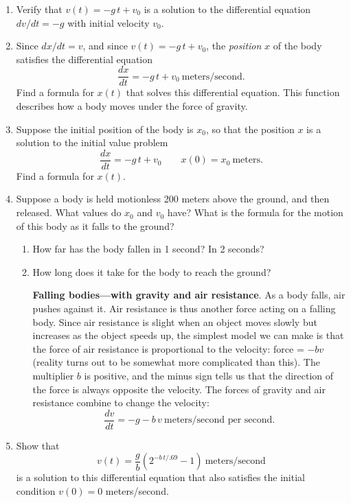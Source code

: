 \begin{enumerate}
\item Verify that $v(t) = -g\,t + v_0$\label{falling body0} is a
solution to the differential equation $dv/dt = -g$ with initial
velocity $v_0$.


\item Since $dx/dt = v$, and since $v(t) = -g\,t + v_0$, the {\em position\/} $x$ of the body satisfies the differential equation
	\[
\dfrac{dx}{dt} = -g\,t + v_0 \ \mbox{meters/second}.
\]
Find a formula for $x(t)$ that solves this differential equation.  This function describes how a body moves under the force of gravity.


\item Suppose the initial position of the body is $x_0$, so that the position $x$ is a solution to the initial value problem
	\[
\dfrac{dx}{dt} = -g\,t + v_0 \qquad x(0) = x_0 \ 
		\mbox{meters}.
\]
Find a formula for $x(t)$.


\item Suppose a body is held motionless 200 meters above the ground, and then released.  What values do $x_0$ and $v_0$ have?  What is the formula for the motion of this body as it falls to the ground?

  \begin{enumerate}
  \item How far has the body fallen in 1 second?  In 2 seconds?

  \item How long does it take for the body to reach the ground?



\label{fall w/air-begin}


{\bf Falling bodies---with gravity and air resistance}.\index{air
  resistance} As a body falls, air pushes against it.  Air resistance
is thus another force acting on a falling body.  Since air resistance
is slight when an object moves slowly but increases as the object
speeds up, the simplest model we can make is that the force of air
resistance is proportional to the velocity: force = $-bv$ (reality
turns out to be somewhat more complicated than this).  The multiplier
$b$ is positive, and the minus sign tells us that the direction of the
force is always opposite the velocity.  The forces of gravity and air
resistance combine to change the velocity:
\[
\dfrac{dv}{dt} = -g - b\,v \ \mbox{meters/second per second}.
\]


\end{enumerate}
\item \label{ex:falling body1}  Show that
	\[
v(t) = \dfrac{g}{b}\left(2^{-b\,t/.69} - 1\right) 
		\ \mbox{meters/second}
\]
is a solution to this differential equation that also satisfies the initial condition $v(0) = 0$ meters/second.




\end{enumerate}

